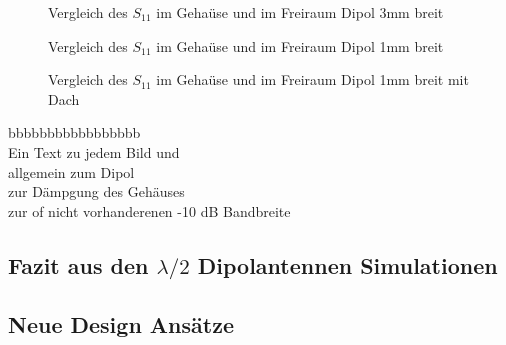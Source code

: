 \begin{figure}[!ht]
	\centering
	\begingroup
	
	\endgroup
	\caption{Vergleich des $S_{11}$ im Gehaüse und im Freiraum Dipol 3mm breit}
	\label{S11_Vergleich_Simulation_3mm}
\end{figure}

\begin{figure}[!ht]
	\centering
	\begingroup
	
	\endgroup
	\caption{Vergleich des $S_{11}$ im Gehaüse und im Freiraum Dipol 1mm breit}
	\label{S11_Vergleich_Simulation_1mm}
\end{figure}

\begin{figure}[!ht]
	\centering
	\begingroup
	
	\endgroup
	\caption{Vergleich des $S_{11}$ im Gehaüse und im Freiraum Dipol 1mm breit mit Dach}
	\label{S11_Vergleich_Simulation_1mm_Dach}
\end{figure}

bbbbbbbbbbbbbbbbb\\
Ein Text zu jedem Bild und\\
allgemein zum Dipol\\
zur Dämpgung des Gehäuses\\
zur of nicht vorhanderenen -10 dB Bandbreite

\subsection{Fazit aus den $\lambda/2$ Dipolantennen Simulationen}

\newpage 
\thispagestyle{empty}
\newpage 
\subsection{Neue Design Ansätze}